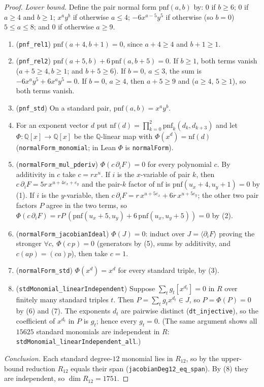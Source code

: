 \documentclass[11pt]{amsart}
\theoremstyle{remark}\newtheorem{remark}[theorem]{Remark}
\newcommand{\Q}{\mathbb{Q}}\newcommand{\PP}{\mathbb{P}}
\begin{document}
\begin{proof}
\emph{Lower bound.} Define the pair normal form $\mathrm{pnf}(a,b)$ by:
$0$ if $b\ge6$; $0$ if $a\ge4$ and $b\ge1$; $x^ay^b$ if otherwise $a\le4$;
$-6x^{a-5}y^5$ if otherwise (so $b=0$) $5\le a\le8$; and $0$ if otherwise $a\ge9$.
\begin{enumerate}
\item (\texttt{pnf\_rel1}) $\mathrm{pnf}(a+4,b+1)=0$, since $a+4\ge4$ and $b+1\ge1$.
\item (\texttt{pnf\_rel2}) $\mathrm{pnf}(a+5,b)+6\,\mathrm{pnf}(a,b+5)=0$. If $b\ge1$, both
terms vanish ($a+5\ge4,b\ge1$; and $b+5\ge6$). If $b=0$, $a\le3$, the sum is
$-6x^ay^5+6x^ay^5=0$. If $b=0$, $a\ge4$, then $a+5\ge9$ and ($a\ge4$, $5\ge1$), so both
terms vanish.
\item (\texttt{pnf\_std}) On a standard pair, $\mathrm{pnf}(a,b)=x^ay^b$.
\item For an exponent vector $d$ put $\mathrm{nf}(d)=\prod_{k=0}^2\mathrm{pnf}_k(d_k,d_{k+3})$
and let $\Phi:\Q[x]\to\Q[x]$ be the $\Q$-linear map with $\Phi(x^d)=\mathrm{nf}(d)$
(\texttt{normalForm\_monomial}; in Lean $\Phi$ is \texttt{normalForm}).
\item (\texttt{normalForm\_mul\_pderiv}) $\Phi(c\,\partial_iF)=0$ for every polynomial $c$. By
additivity in $c$ take $c=rx^u$. If $i$ is the $x$-variable of pair $k$, then
$c\,\partial_iF=5r\,x^{u+4e_x+e_y}$ and the pair-$k$ factor of $\mathrm{nf}$ is
$\mathrm{pnf}(u_x+4,u_y+1)=0$ by (1). If $i$ is the $y$-variable, then
$c\,\partial_iF=r\,x^{u+5e_x}+6r\,x^{u+5e_y}$; the other two pair factors $P$ agree in the
two terms, so $\Phi(c\,\partial_iF)=rP\,(\mathrm{pnf}(u_x+5,u_y)+6\,\mathrm{pnf}(u_x,u_y+5))=0$
by (2).
\item (\texttt{normalForm\_jacobianIdeal}) $\Phi(J)=0$: induct over $J=\langle\partial_iF\rangle$
proving the stronger $\forall c,\ \Phi(c\,p)=0$ (generators by (5), sums by additivity,
and $c(ap)=(ca)p$), then take $c=1$.
\item (\texttt{normalForm\_std}) $\Phi(x^{d})=x^{d}$ for every standard triple, by (3).
\item (\texttt{stdMonomial\_linearIndependent}) Suppose $\sum_t g_t[x^{d_t}]=0$ in $R$ over
finitely many standard triples $t$. Then $P=\sum_t g_tx^{d_t}\in J$, so $P=\Phi(P)=0$ by
(6) and (7). The exponents $d_t$ are pairwise distinct (\texttt{dt\_injective}), so the
coefficient of $x^{d_t}$ in $P$ is $g_t$; hence every $g_t=0$. (The same argument shows all
$15625$ standard monomials are independent in $R$:
\texttt{stdMonomial\_linearIndependent\_all}.)
\end{enumerate}
\emph{Conclusion.} Each standard degree-$12$ monomial lies in $R_{12}$, so by the upper-bound
reduction $R_{12}$ equals their span (\texttt{jacobianDeg12\_eq\_span}). By (8) they are
independent, so $\dim R_{12}=1751$.
\end{proof}
\end{document}
